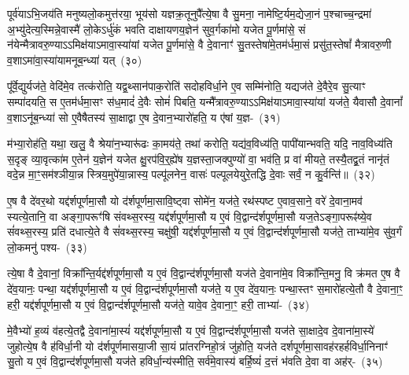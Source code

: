 पूर्व॑या\-ऽभि॒जय॑ति मनुष्यलो॒कमुत्त॑रया॒ भूय॑सो यज्ञक्र॒तूनुपै᳚त्ये॒षा वै सु॒मना॒ नामेष्टि॒र्यम॒द्येजा॒नं प॒श्चाच्च॒न्द्रमा॑ अ॒भ्यु॑देत्य॒स्मिन्ने॒वास्मै॑ लो॒के\-ऽर्धु॑कं भवति दाक्षायणय॒ज्ञेन॑ सुव॒र्गका॑मो यजेत पू॒र्णमा॑से॒ सं न॑येन्मैत्रावरु॒ण्या\-ऽऽ\-\-मिक्ष॑या\-ऽमावा॒स्या॑यां यजेत पू॒र्णमा॑से॒ वै दे॒वानाꣳ॑ सु॒तस्तेषा॑मे॒तम॑र्धमा॒सं प्रसु॑त॒स्तेषां᳚ मैत्रावरु॒णी व॒शा\-ऽमा॑वा॒स्या॑यामनूब॒न्ध्या॑ यत्~(३०)

पू᳚र्वे॒द्युर्यज॑ते॒ वेदि॑मे॒व तत्क॑रोति॒ यद्व॒थ्सान॑पाक॒रोति॑ सदोहविर्धा॒ने ए॒व सम्मि॑नोति॒ यद्यज॑ते दे॒वैरे॒व सु॒त्याꣳ सम्पा॑दयति॒ स ए॒तम॑र्धमा॒सꣳ स॑ध॒मादं॑ दे॒वैः सोमं॑ पिबति॒ यन्मै᳚त्रावरु॒ण्या\-ऽऽ\-\-मिक्ष॑या\-ऽमावा॒स्या॑यां यज॑ते॒ यैवासौ दे॒वानां᳚ व॒शा\-ऽनू॑ब॒न्ध्या॑ सो ए॒वैषैतस्य॑ सा॒क्षाद्वा ए॒ष दे॒वान॒भ्यारो॑हति॒ य ए॑षां य॒ज्ञ-~(३१)

म॑भ्या॒रोह॑ति॒ यथा॒ खलु॒ वै श्रेया॑न॒भ्यारू॑ढः का॒मय॑ते॒ तथा॑ करोति॒ यद्य॑व॒विध्य॑ति॒ पापी॑यान्भवति॒ यदि॒ नाव॒विध्य॑ति स॒दृङ् व्या॒वृत्का॑म ए॒तेन॑ य॒ज्ञेन॑ यजेत क्षु॒रप॑वि॒र्॒\mbox{}ह्ये॑ष य॒ज्ञस्ता॒जक्पुण्यो॑ वा॒ भव॑ति॒ प्र वा॑ मीयते॒ तस्यै॒तद्व्र॒तं नानृ॑तं वदे॒न्न मा॒ꣳ॒सम॑श्ञीया॒न्न स्त्रिय॒\-मु\-पे॑या॒न्नास्य॒ पल्पू॑लनेन॒ वासः॑ पल्पूलयेयुरे॒तद्धि दे॒वाः सर्वं॒ न कु॒र्वन्ति॑॥~(३२)

{\anuvakamend[{च॒न्द्रमा॒ द्वे दे॑वलो॒कमे॒व यद्य॒ज्ञं प॑ल्पूलयेयुः॒ षट्च॑}]}%

ए॒ष वै दे॑वर॒थो यद्द॑र्\mbox{}श\-पूर्ण\-मा॒सौ यो द॑र्\mbox{}शपूर्णमा॒सावि॒ष्ट्वा सोमे॑न॒ यज॑ते॒ रथ॑स्पष्ट ए॒वाव॒साने॒ वरे॑ दे॒वाना॒मव॑ स्यत्ये॒तानि॒ वा अङ्गा॒परूꣳ॑षि संवथ्स॒रस्य॒ यद्द॑र्\mbox{}श\-पूर्ण\-मा॒सौ य ए॒वं वि॒द्वान्द॑र्\mbox{}शपूर्णमा॒सौ यज॒ते\-ऽङ्गा॒परूꣴ॑ष्ये॒व सं॑वथ्स॒रस्य॒ प्रति॑ दधात्ये॒ते वै सं॑वथ्स॒रस्य॒ चक्षु॑षी॒ यद्द॑र्\mbox{}श\-पूर्ण\-मा॒सौ य ए॒वं वि॒द्वान्द॑र्\mbox{}शपूर्णमा॒सौ यज॑ते॒ ताभ्या॑मे॒व सु॑व॒र्गं लो॒कमनु॑ \mbox{पश्य-~(३३)}

त्ये॒षा वै दे॒वानां॒ विक्रा᳚न्ति॒र्यद्द॑र्\mbox{}श\-पूर्ण\-मा॒सौ य ए॒वं वि॒द्वान्द॑र्\mbox{}शपूर्णमा॒सौ यज॑ते दे॒वाना॑मे॒व विक्रा᳚न्ति॒मनु॒ वि क्र॑मत ए॒ष वै दे॑व॒यानः॒ पन्था॒ यद्द॑र्\mbox{}श\-पूर्ण\-मा॒सौ य ए॒वं वि॒द्वान्द॑र्\mbox{}शपूर्णमा॒सौ यज॑ते॒ य ए॒व दे॑व॒यानः॒ पन्था॒स्तꣳ स॒मारो॑हत्ये॒तौ वै दे॒वाना॒ꣳ॒ हरी॒ यद्द॑र्\mbox{}श\-पूर्ण\-मा॒सौ य ए॒वं वि॒द्वान्द॑र्\mbox{}शपूर्णमा॒सौ यज॑ते॒ यावे॒व दे॒वाना॒ꣳ॒ हरी॒ ताभ्या॑-~(३४)

मे॒वैभ्यो॑ ह॒व्यं व॑हत्ये॒तद्वै दे॒वाना॑मा॒स्यं॑ यद्द॑र्\mbox{}श\-पूर्ण\-मा॒सौ य ए॒वं वि॒द्वान्द॑र्\mbox{}शपूर्णमा॒सौ यज॑ते सा॒क्षादे॒व दे॒वाना॑मा॒स्ये॑ जुहोत्ये॒ष वै ह॑विर्धा॒नी यो द॑र्\mbox{}शपूर्णमासया॒जी सा॒यं प्रा॑तरग्निहो॒त्रं जु॑होति॒ यज॑ते दर्\mbox{}श\-पूर्ण\-मा॒सावह॑रहर्\mbox{}हविर्धा॒निनाꣳ॑ सु॒तो य ए॒वं वि॒द्वान्द॑र्\mbox{}शपूर्णमा॒सौ यज॑ते हविर्धा॒न्य॑स्मीति॒ सर्व॑मे॒वास्य॑ बर्\mbox{}हि॒ष्यं॑ द॒त्तं भ॑वति दे॒वा वा अह॑र्-~(३५)

